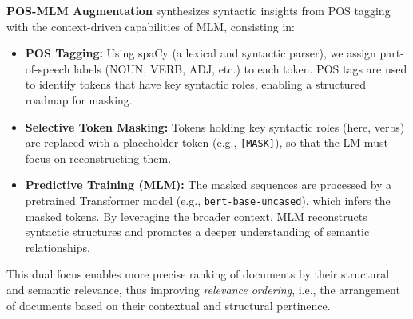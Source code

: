 \textbf{POS-MLM Augmentation} synthesizes syntactic insights from POS tagging with the context-driven capabilities of MLM, consisting in:
\begin{itemize}
    \item \textbf{POS Tagging:} Using spaCy (a lexical and syntactic parser), we assign part-of-speech labels (NOUN, VERB, ADJ, etc.) to each token. POS tags are used to identify tokens that have key syntactic roles, enabling a structured roadmap for masking.
    \item \textbf{Selective Token Masking:} Tokens holding key syntactic roles (here, verbs) are replaced with a placeholder token (e.g., \texttt{[MASK]}), so that the LM must focus on reconstructing them.
    \item \textbf{Predictive Training (MLM):} The masked sequences are processed by a pretrained Transformer model (e.g., \texttt{bert-base-uncased}), which infers the masked tokens. By leveraging the broader context, MLM reconstructs syntactic structures and promotes a deeper understanding of semantic relationships.
\end{itemize}

This dual focus enables more precise ranking of documents by their structural and semantic relevance, thus improving \textit{relevance ordering}, i.e., the arrangement of documents based on their contextual and structural pertinence.


